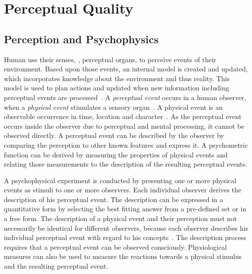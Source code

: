 \section{Perceptual Quality}
\subsection{Perception and Psychophysics} %
Human use their senses, \ie, perceptual organs, to perceive events of their environment.
Based upon those events, an internal model is created and updated, which incorporates knowledge about the environment and thus reality.
This model is used to plan actions and updated when new information including perceptual events are processed~\citep[p. 4]{blauert_spatial_1996}.
A \emph{perceptual event} occurs in a human observer, when a \emph{physical event} stimulates a sensory organ~\citep{blauert_spatial_1996}.
A physical event is an observable occurrence in time, location and character~\citep{callet_qualinet_2013}.
As the perceptual event occurs inside the observer due to perceptual and mental processing, it cannot be observed directly.
A perceptual event can be described by the observer by comparing the perception to other known features and express it.
A psychometric function can be derived by measuring the properties of physical events and relating those measurements to the description of the resulting perceptual events.

A psychophysical experiment is conducted by presenting one or more physical events as stimuli to one or more observers.
Each individual observer derives the description of his perceptual event.
The description can be expressed in a quantitative form by selecting the best fitting answer from a pre-defined set or in a free form.
The description of a physical event and their perception must not necessarily be identical for different observers, because each observer describes his individual perceptual event with regard to his concepts~\citep[p. 11]{blauert_spatial_1996}.
The description process requires that a perceptual event can be observed consciously.
Physiological measures can also be used to measure the reactions towards a physical stimulus and the resulting perceptual event.

